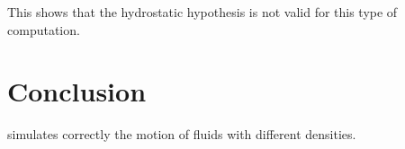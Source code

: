 This shows that the hydrostatic hypothesis is not valid for this type of
computation.
%
\section{Conclusion}
%
 simulates correctly the motion of fluids with different
densities.
%
%
